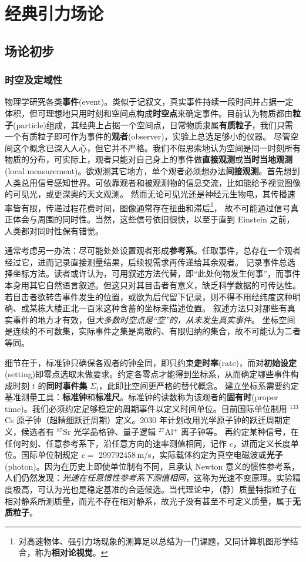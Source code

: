 \chapter{经典引力场论}\label{chpt:GR}
\section{场论初步}
\subsection{时空及定域性}

物理学研究各类\textbf{事件}(event)。类似于记叙文，真实事件持续一段时间并占据一定体积，但可理想地只用时刻和空间点构成\textbf{时空点}来确定事件。目前认为物质都由\textbf{粒子}(particle)组成，其经典上占据一个空间点，日常物质隶属\textbf{有质粒子}，我们只需一个有质粒子即可作为事件的\textbf{观者}(observer)，实验上总选足够小的仪器。
尽管空间这个概念已深入人心，但它并不严格。我们不假思索地认为空间是同一时刻所有物质的分布，可实际上，观者只能对自己身上的事件做\textbf{直接观测}或\textbf{当时当地观测}(local measurement)。欲观测其它地方，单个观者必须想办法\textbf{间接观测}。首先想到人类总用信号感知世界。可依靠观者和被观测物的信息交流，比如能给予视觉图像的可见光，或更深奥的天文观测。
然而无论可见光还是神经元生物电，其传播速率皆有限，传递过程花费时间，图像通常存在扭曲和滞后\footnote{对高速物体、强引力场现象的测算足以总结为一门课题，又同计算机图形学结合，称为\textbf{相对论视觉}。}，
故不可能通过信号真正体会与周围的同时性。当然，这些信号依旧很快，以至于直到 Einstein 之前，人类都对同时性保有错觉。

通常考虑另一办法：尽可能处处设置观者形成\textbf{参考系}。任取事件，总存在一个观者经过它，进而记录直接测量结果，后续视需求再传递给其余观者。
记录事件总选择坐标方法。读者或许认为，可用叙述方法代替，即“此处何物发生何事”，而事件本身用其它自然语言叙述。但这只对其目击者有意义，缺乏科学数据的可传达性。若目击者欲转告事件发生的位置，或欲为后代留下记录，则不得不用经纬度这种明确、或某栋大楼正北一百米这种含蓄的坐标来描述位置。
叙述方法只对那些有真实事件的地方才有效，但\textit{大多数时空点是“空”的，从未发生真实事件}。
坐标空间是连续的不可数集，实际事件之集是离散的、有限归纳的集合，故不可能认为二者等同。

细节在于，标准钟只确保各观者的钟全同，即只约束\textbf{走时率}(rate)，而对\textbf{初始设定}(setting)即零点选取未做要求。约定各零点才能得到坐标系，从而确定哪些事件构成时刻 $t$ 的\textbf{同时事件集} $\Sigma_t$，此即比空间更严格的替代概念。
建立坐标系需要约定基准测量工具：\textbf{标准钟}和\textbf{标准尺}。标准钟的读数称为该观者的\textbf{固有时}(proper time)。我们必须约定足够稳定的周期事件以定义时间单位。目前国际单位制用 $^{133}$Cs 原子钟（超精细跃迁周期）定义。2030 年计划改用光学原子钟的跃迁周期定义，候选者有 $^{87}$Sr 光学晶格钟、量子逻辑 $^{27}$Al$^+$ 离子钟等。
再约定某种信号，在任何时刻、任意参考系下，沿任意方向的速率测值相同，记作 $c$，进而定义长度单位。国际单位制规定 $c=$ 299792458\,m/s，实际载体约定为真空电磁波或\textbf{光子}(photon)。因为在历史上即使单位制有不同，且承认 Newton 意义的惯性参考系，人们仍然发现：\textit{光速在任意惯性参考系下测值相同}，这称为光速不变原理。实验精度极高，可认为光也是稳定基准的合适候选。当代理论中，（静）质量特指粒子在相对静系所测质量，而光不存在相对静系，故光子没有甚至不可定义质量，属于\textbf{无质粒子}。

